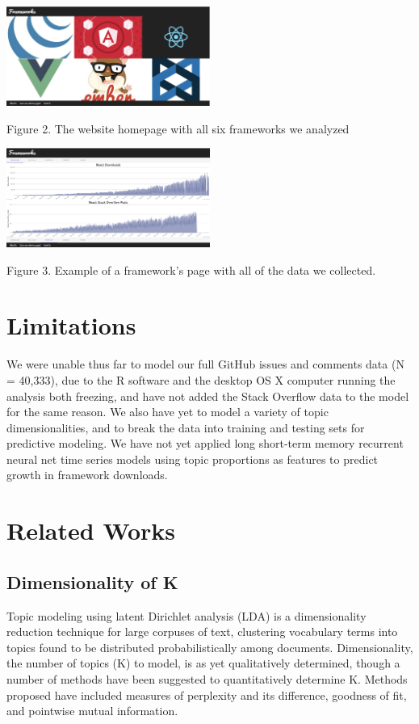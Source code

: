 \documentclass[conference]{IEEEtran}
\begin{document}
\includegraphics[width=0.5\textwidth]{"fig2"}
\caption{Figure 2. The website homepage with all six frameworks we analyzed}

\includegraphics[width=0.5\textwidth]{"fig3"}
\caption{Figure 3. Example of a framework's page with all of the data we collected.}

\section{Limitations}
We were unable thus far to model our full GitHub issues and comments data (N = 40,333), due to the R software and the desktop OS X computer running the analysis both freezing, and have not added the Stack Overflow data to the model for the same reason. We also have yet to model a variety of topic dimensionalities, and to break the data into training and testing sets for predictive modeling. We have not yet applied long short-term memory recurrent neural net time series models using topic proportions as features to predict growth in framework downloads.

\section{Related Works}

\subsection{Dimensionality of K}
Topic modeling using latent Dirichlet analysis (LDA) is a dimensionality reduction technique for large corpuses of text, clustering vocabulary terms into topics found to be distributed probabilistically among documents. Dimensionality, the number of topics (K) to model, is as yet qualitatively determined, though a number of methods have been suggested to quantitatively determine K. Methods proposed have included measures of perplexity and its difference, goodness of fit, and pointwise mutual information.
\end{document}
